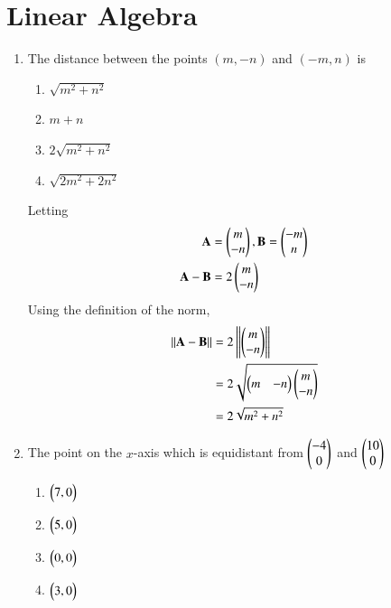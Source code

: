 \documentclass[journal,12pt,twocolumn]{IEEEtran}
\renewcommand\thesection{\arabic{section}}
\begin{document}
\section{Linear Algebra}
\begin{enumerate}[label=\thesection.\arabic*.,ref=\thesection.\theenumi]
\item The distance between the points $(m , -n)$ and $(-m , n)$ is
\begin{enumerate}
    \item $\sqrt{m^2 + n^2}$
    \item $m + n$
    \item $2\sqrt{m^2 + n^2}$
    \item $\sqrt{2m^2 + 2n^2}$
\end{enumerate}
		\solution Letting 
		\begin{align}
			\mathbf{A} &= \begin{pmatrix}m \\ -n\end{pmatrix}, \mathbf{B}=\begin{pmatrix}-m \\ n\end{pmatrix}
			\\
			\mathbf{A}-\mathbf{B} &= 2\begin{pmatrix}m \\ -n\end{pmatrix}
		\end{align}
Using the definition   of the norm, 
		\begin{align}
\left\lVert\mathbf{A}-\mathbf{B}\right\rVert &=2\left\lVert\begin{pmatrix}m \\ -n\end{pmatrix}\right\rVert
			\\
			&=2 \sqrt{\begin{pmatrix}m & -n\end{pmatrix}\begin{pmatrix}m \\ -n\end{pmatrix}} 
\\
			&			= 2 \sqrt{m^2+n^2}
		\end{align}

\item The point on the $x$-axis which is equidistant from $\begin{pmatrix}-4 \\ 0\end{pmatrix}$ and $\begin{pmatrix}10\\0\end{pmatrix}$\\
\begin{enumerate}
\item $\begin{pmatrix}7,0\end{pmatrix}$
\item $\begin{pmatrix}5,0\end{pmatrix}$
\item $\begin{pmatrix}0,0\end{pmatrix}$
\item $\begin{pmatrix}3,0\end{pmatrix}$
\end{enumerate}


\end{enumerate}
\end{document}
